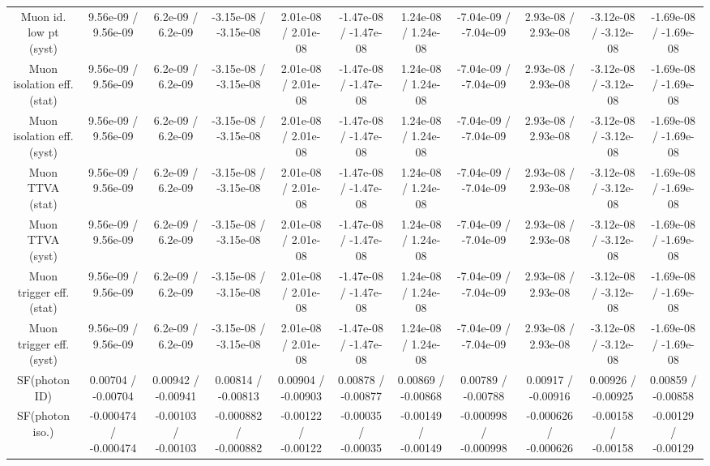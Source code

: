 \begin{table}[htbp]
\begin{center}
\begin{tabular}{|c|c|c|c|c|c|c|c|c|c|c|}
  Muon id. low pt (syst) & 9.56e-09 / 9.56e-09 & 6.2e-09 / 6.2e-09 & -3.15e-08 / -3.15e-08 & 2.01e-08 / 2.01e-08 & -1.47e-08 / -1.47e-08 & 1.24e-08 / 1.24e-08 & -7.04e-09 / -7.04e-09 & 2.93e-08 / 2.93e-08 & -3.12e-08 / -3.12e-08 & -1.69e-08 / -1.69e-08 \\ 
  Muon isolation eff. (stat) & 9.56e-09 / 9.56e-09 & 6.2e-09 / 6.2e-09 & -3.15e-08 / -3.15e-08 & 2.01e-08 / 2.01e-08 & -1.47e-08 / -1.47e-08 & 1.24e-08 / 1.24e-08 & -7.04e-09 / -7.04e-09 & 2.93e-08 / 2.93e-08 & -3.12e-08 / -3.12e-08 & -1.69e-08 / -1.69e-08 \\ 
  Muon isolation eff. (syst) & 9.56e-09 / 9.56e-09 & 6.2e-09 / 6.2e-09 & -3.15e-08 / -3.15e-08 & 2.01e-08 / 2.01e-08 & -1.47e-08 / -1.47e-08 & 1.24e-08 / 1.24e-08 & -7.04e-09 / -7.04e-09 & 2.93e-08 / 2.93e-08 & -3.12e-08 / -3.12e-08 & -1.69e-08 / -1.69e-08 \\ 
  Muon TTVA (stat) & 9.56e-09 / 9.56e-09 & 6.2e-09 / 6.2e-09 & -3.15e-08 / -3.15e-08 & 2.01e-08 / 2.01e-08 & -1.47e-08 / -1.47e-08 & 1.24e-08 / 1.24e-08 & -7.04e-09 / -7.04e-09 & 2.93e-08 / 2.93e-08 & -3.12e-08 / -3.12e-08 & -1.69e-08 / -1.69e-08 \\ 
  Muon TTVA (syst) & 9.56e-09 / 9.56e-09 & 6.2e-09 / 6.2e-09 & -3.15e-08 / -3.15e-08 & 2.01e-08 / 2.01e-08 & -1.47e-08 / -1.47e-08 & 1.24e-08 / 1.24e-08 & -7.04e-09 / -7.04e-09 & 2.93e-08 / 2.93e-08 & -3.12e-08 / -3.12e-08 & -1.69e-08 / -1.69e-08 \\ 
  Muon trigger eff. (stat) & 9.56e-09 / 9.56e-09 & 6.2e-09 / 6.2e-09 & -3.15e-08 / -3.15e-08 & 2.01e-08 / 2.01e-08 & -1.47e-08 / -1.47e-08 & 1.24e-08 / 1.24e-08 & -7.04e-09 / -7.04e-09 & 2.93e-08 / 2.93e-08 & -3.12e-08 / -3.12e-08 & -1.69e-08 / -1.69e-08 \\ 
  Muon trigger eff. (syst) & 9.56e-09 / 9.56e-09 & 6.2e-09 / 6.2e-09 & -3.15e-08 / -3.15e-08 & 2.01e-08 / 2.01e-08 & -1.47e-08 / -1.47e-08 & 1.24e-08 / 1.24e-08 & -7.04e-09 / -7.04e-09 & 2.93e-08 / 2.93e-08 & -3.12e-08 / -3.12e-08 & -1.69e-08 / -1.69e-08 \\ 
  SF(photon ID) & 0.00704 / -0.00704 & 0.00942 / -0.00941 & 0.00814 / -0.00813 & 0.00904 / -0.00903 & 0.00878 / -0.00877 & 0.00869 / -0.00868 & 0.00789 / -0.00788 & 0.00917 / -0.00916 & 0.00926 / -0.00925 & 0.00859 / -0.00858 \\ 
  SF(photon iso.) & -0.000474 / -0.000474 & -0.00103 / -0.00103 & -0.000882 / -0.000882 & -0.00122 / -0.00122 & -0.00035 / -0.00035 & -0.00149 / -0.00149 & -0.000998 / -0.000998 & -0.000626 / -0.000626 & -0.00158 / -0.00158 & -0.00129 / -0.00129 \\ 

\end{tabular}
\end{center}
\end{table}
